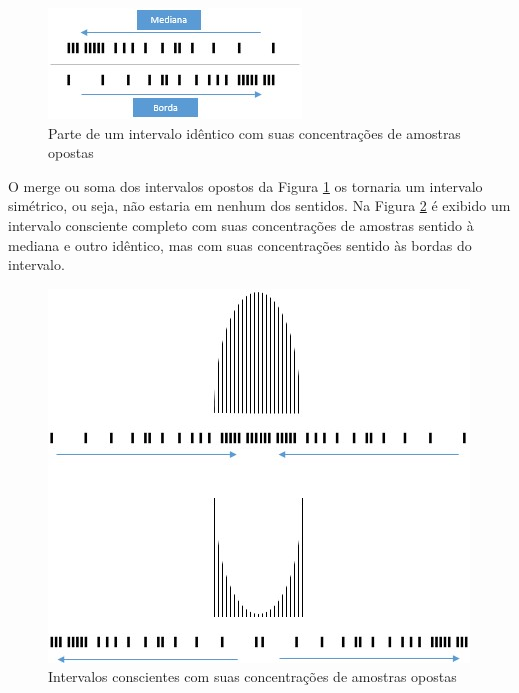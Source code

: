 \begin{figure}[H]
\caption{Parte de um intervalo idêntico com suas concentrações de amostras opostas}
\label{fig:consciousness_concentration_of_opposite_samples}
\centering
\includegraphics[scale=1]{sections/images/consciousness_concentration_of_opposite_samples.jpg}
\end{figure}

O merge ou soma dos intervalos opostos da Figura \ref{fig:consciousness_concentration_of_opposite_samples} os tornaria um intervalo simétrico, ou seja, não estaria em nenhum dos sentidos.
Na Figura \ref{fig:consciousness_concentration_of_opposite_samples_within_range} é exibido um intervalo consciente completo com suas concentrações de amostras sentido à mediana e outro idêntico, mas com suas concentrações sentido às bordas do intervalo.

\begin{figure}[H]
\caption{Intervalos conscientes com suas concentrações de amostras opostas}
\label{fig:consciousness_concentration_of_opposite_samples_within_range}
\centering
\includegraphics[scale=.8]{sections/images/consciousness_concentration_of_opposite_samples_within_range.jpg}
\end{figure}


